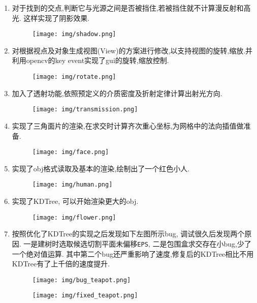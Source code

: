 \begin{enumerate}
  \item
    对于找到的交点,判断它与光源之间是否被挡住,若被挡住就不计算漫反射和高光. 这样实现了阴影效果.
    \begin{figure}[H]
      \centering
      \texttt{[image: img/shadow.png]}
      \caption*{\label{fig:shadow}}
    \end{figure}

  \item 对根据视点及对象生成视图(View)的方案进行修改,以支持视图的旋转,缩放.并利用opencv的key event实现了gui的旋转,缩放控制.
    \begin{figure}[H]
      \centering
      \texttt{[image: img/rotate.png]}
      \caption*{\label{fig:rotate}}
    \end{figure}

  \item 加入了透射功能,依照预定义的介质密度及折射定律计算出射光方向.
    \begin{figure}[H]
      \centering
      \texttt{[image: img/transmission.png]}
      \caption*{\label{fig:transmission}}
    \end{figure}

  \item 实现了三角面片的渲染,在求交时计算齐次重心坐标,为网格中的法向插值做准备.
    \begin{figure}[H]
      \centering
      \texttt{[image: img/face.png]}
      \caption*{\label{fig:face}}
    \end{figure}

  \item 实现了obj格式读取及基本的渲染,绘制出了一个红色小人.
    \begin{figure}[H]
      \centering
      \texttt{[image: img/human.png]}
      \caption*{\label{fig:human}}
    \end{figure}

  \item 实现了KDTree, 可以开始渲染更大的obj.
    \begin{figure}[H]
      \centering
      \texttt{[image: img/flower.png]}
      \caption*{\label{fig:flower}}
    \end{figure}

  \item 按照\cite{kdtree}优化了KDTree的实现之后发现如下左图所示bug, 调试很久后发现两个原因.
    一是建树时选取候选切割平面未偏移\verb|EPS|, 二是包围盒求交存在小bug,少了一个绝对值运算.
    其中第二个bug还严重影响了速度,修复后的KDTree相比不用KDTree有了上千倍的速度提升.
    \begin{figure}[H]
      \centering
      \begin{minipage}[b]{0.46\linewidth}
        \centering
        \texttt{[image: img/bug\_teapot.png]}
      \end{minipage}
      \begin{minipage}[b]{0.46\linewidth}
        \centering
        \texttt{[image: img/fixed\_teapot.png]}
      \end{minipage}
      \caption*{\label{fig:kdtree_bug}}
    \end{figure}


\end{enumerate}
